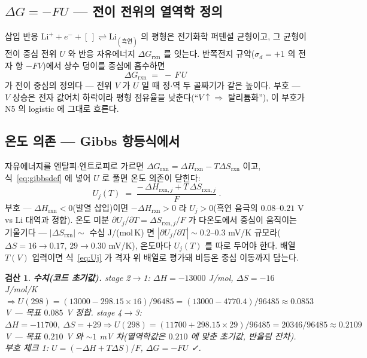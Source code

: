 \documentclass[11pt,a4paper]{article}
\newtheorem*{verifybox}{검산}
\newcommand{\sgn}{\sigma_d}
\begin{document}
\subsection{$\Delta G=-FU$ — 전이 전위의 열역학 정의}
삽입 반응 $\mathrm{Li}^++e^-+[\,]\rightleftharpoons\mathrm{Li}_{(\text{흑연})}$ 의 평형은 전기화학 퍼텐셜 균형이고, 그 균형이 전이 중심 전위 $U$ 와 반응 자유에너지 $\Delta G_{\mathrm{rxn}}$ 를 잇는다. 반쪽전지 규약($\sgn=+1$ 의 전자 항 $-FV$)에서 상수 덩이를 중심에 흡수하면
\begin{equation}
\Delta G_{\mathrm{rxn}}\;=\;-\,F\,U
\label{eq:gibbsdef}
\end{equation}
가 전이 중심의 정의다 — 전위 $V$ 가 $U$ 일 때 정$\cdot$역 두 골짜기가 같은 높이다. 부호 — $V$ 상승은 전자 값어치 하락이라 평형 점유율을 낮춘다(``$V\!\uparrow\Rightarrow$ 탈리튬화''), 이 부호가 N5 의 logistic 에 그대로 흐른다.

\subsection{온도 의존 — Gibbs 항등식에서}
자유에너지를 엔탈피$\cdot$엔트로피로 가르면 $\Delta G_{\mathrm{rxn}}=\Delta H_{\mathrm{rxn}}-T\Delta S_{\mathrm{rxn}}$ 이고, 식~\eqref{eq:gibbsdef} 에 넣어 $U$ 로 풀면 온도 의존이 닫힌다:
\begin{equation}
\boxed{\;U_j(T)\;=\;\frac{-\,\Delta H_{\mathrm{rxn},j}+T\,\Delta S_{\mathrm{rxn},j}}{F}\;.}
\label{eq:Uj}
\end{equation}
부호 — $\Delta H_{\mathrm{rxn}}<0$(발열 삽입)이면 $-\Delta H_{\mathrm{rxn}}>0$ 라 $U_j>0$(흑연 음극의 $0.08$--$0.21$ V vs Li 대역과 정합). 온도 미분 $\partial U_j/\partial T=\Delta S_{\mathrm{rxn},j}/F$ 가 다온도에서 중심이 움직이는 기울기다 — $|\Delta S_{\mathrm{rxn}}|\sim$ 수십 J/(mol\,K) 면 $|\partial U_j/\partial T|\sim0.2$--$0.3$ mV/K 규모라($\Delta S=16\to0.17$, $29\to0.30$ mV/K), 온도마다 $U_j(T)$ 를 따로 두어야 한다. 배열 $T(V)$ 입력이면 식~\eqref{eq:Uj} 가 격자 위 배열로 평가돼 비등온 중심 이동까지 담는다.

\begin{verifybox}
\textbf{수치(코드 초기값).} stage 2$\to$1: $\Delta H=-13000$ J/mol, $\Delta S=-16$ J/mol/K $\Rightarrow U(298)=(13000-298.15\times16)/96485=(13000-4770.4)/96485\approx0.0853$ V — 목표 $0.085$ V 정합. stage 4$\to$3: $\Delta H=-11700,\ \Delta S=+29 \Rightarrow U(298)=(11700+298.15\times29)/96485=20346/96485\approx0.2109$ V — 목표 $0.210$ V 와 $\sim1$ mV 차(열역학값은 $0.210$ 에 맞춘 초기값, 반올림 잔차). 부호 체크 1: $U=(-\Delta H+T\Delta S)/F$, $\Delta G=-FU$ ✓.
\end{verifybox}
\end{document}
